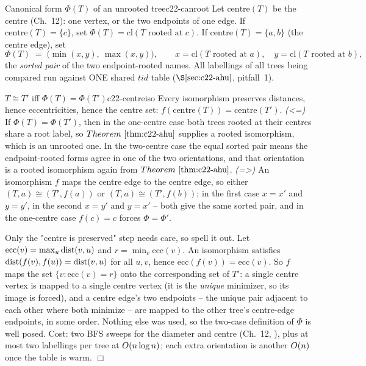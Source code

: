 \begin{definition}{Canonical form \(\Phi(T)\) of an unrooted tree}{c22-canroot}
Let \(\mathrm{centre}(T)\) be the centre (Ch.~12): one vertex, or the two
endpoints of one edge.  If \(\mathrm{centre}(T)=\{c\}\), set
\(\Phi(T)=\mathrm{cl}(T\text{ rooted at }c)\).  If
\(\mathrm{centre}(T)=\{a,b\}\) (the centre edge), set
\[
   \Phi(T)\;=\;\bigl(\min(x,y),\ \max(x,y)\bigr),\qquad
   x=\mathrm{cl}(T\text{ rooted at }a),\quad y=\mathrm{cl}(T\text{ rooted at }b),
\]
the \emph{sorted pair} of the two endpoint-rooted names.  All labellings of all
trees being compared run against ONE shared \(\mathit{tid}\) table
(\(\secref{c22-ahu}\), pitfall~1).
\end{definition}

\begin{theorem}{\(T\cong T'\) iff \(\Phi(T)=\Phi(T')\)}{c22-centreiso}
Every isomorphism preserves distances, hence eccentricities, hence the centre
set: \(f(\mathrm{centre}(T))=\mathrm{centre}(T')\).  \emph{(<=)} If
\(\Phi(T)=\Phi(T')\), then in the one-centre case both trees rooted at their
centres share a root label, so \(\thmref{c22-ahu}\) supplies a rooted isomorphism,
which is an unrooted one.  In the two-centre case the equal sorted pair means the
endpoint-rooted forms agree in one of the two orientations, and that orientation
is a rooted isomorphism again from \(\thmref{c22-ahu}\).  \emph{(=>)} An
isomorphism \(f\) maps the centre edge to the centre edge, so either
\((T,a)\cong(T',f(a))\) or \((T,a)\cong(T',f(b))\); in the first case
\(x=x'\) and \(y=y'\), in the second \(x=y'\) and \(y=x'\) -- both give the same
sorted pair, and in the one-centre case \(f(c)=c\) forces \(\Phi=\Phi'\).
\end{theorem}
\begin{proofbox}
Only the "centre is preserved" step needs care, so spell it out.  Let
\(\mathrm{ecc}(v)=\max_u \operatorname{dist}(v,u)\) and \(r=\min_v \mathrm{ecc}(v)\).  An
isomorphism satisfies \(\operatorname{dist}(f(v),f(u))=\operatorname{dist}(v,u)\) for all \(u,v\), hence
\(\mathrm{ecc}(f(v))=\mathrm{ecc}(v)\).  So \(f\) maps the set
\(\{v:\mathrm{ecc}(v)=r\}\) onto the corresponding set of \(T'\): a single centre
vertex is mapped to a single centre vertex (it is the \emph{unique} minimizer, so
its image is forced), and a centre edge's two endpoints -- the unique pair
adjacent to each other where both minimize -- are mapped to the other tree's
centre-edge endpoints, in some order.  Nothing else was used, so the two-case
definition of \(\Phi\) is well posed.  Cost: two BFS sweeps for the diameter and
centre (Ch.~12, ), plus at most two labellings per tree at
\(O(n\log n)\); each extra orientation is another \(O(n)\) once the table
is warm. \(\Box\)
\end{proofbox}

